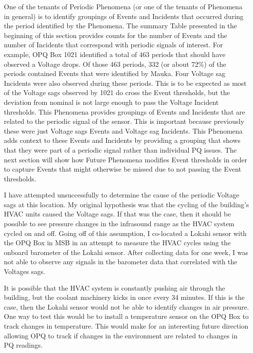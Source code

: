 One of the tenants of Periodic Phenomena (or one of the tenants of Phenomena in general) is to identify groupings of Events and Incidents that occurred during the period identified by the Phenomena. The summary Table presented in the beginning of this section provides counts for the number of Events and the number of Incidents that correspond with periodic signals of interest. For example, OPQ Box 1021 identified a total of 463 periods that should have observed a Voltage drops. Of those 463 periods, 332 (or about 72\%) of the periods contained Events that were identified by Mauka. Four Voltage sag Incidents were also observed during these periods. This is to be expected as most of the Voltage sags observed by 1021 do cross the Event thresholds, but the deviation from nominal is not large enough to pass the Voltage Incident thresholds. This Phenomena provides groupings of Events and Incidents that are related to the periodic signal of the sensor. This is important because previously these were just Voltage sags Events and Voltage sag Incidents. This Phenomena adds context to these Events and Incidents by providing a grouping that shows that they were part of a periodic signal rather than individual PQ issues. The next section will show how Future Phenomena modifies Event thresholds in order to capture Events that might otherwise be missed due to not passing the Event thresholds.

I have attempted unsuccessfully to determine the cause of the periodic Voltage sags at this location. My original hypothesis was that the cycling of the building's HVAC units caused the Voltage sags. If that was the case, then it should be possible to see pressure changes in the infrasound range as the HVAC system cycled on and off. Going off of this assumption, I co-located a Lokahi sensor with the OPQ Box in MSB in an attempt to measure the HVAC cycles using the onboard barometer of the Lokahi sensor. After collecting data for one week, I was not able to observe any signals in the barometer data that correlated with the Voltages sags.

It is possible that the HVAC system is constantly pushing air through the building, but the coolant machinery kicks in once every 34 minutes. If this is the case, then the Lokahi sensor would not be able to identify changes in air pressure. One way to test this would be to install a temperature sensor on the OPQ Box to track changes in temperature. This would make for an interesting future direction allowing OPQ to track if changes in the environment are related to changes in PQ readings.


